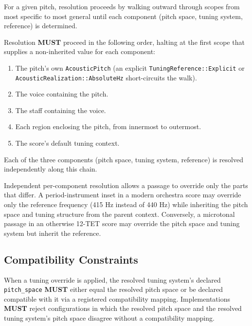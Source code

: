 \documentclass[11pt,letterpaper]{report}
\newcounter{requirement}[chapter]
\newcommand{\MUST}{\textbf{MUST}}
\begin{document}
For a given pitch, resolution proceeds by walking outward through
scopes from most specific to most general until each component
(pitch space, tuning system, reference) is determined.

\begin{requirement}
  \label{req:tuning:tuning-resolution-order}
  Resolution \MUST{} proceed in the following order, halting at the
  first scope that supplies a non-inherited value for each component:

  \begin{enumerate}
    \item The pitch's own \texttt{AcousticPitch} (an explicit
      \texttt{TuningReference::Explicit} or
      \texttt{AcousticRealization::AbsoluteHz} short-circuits the
      walk).
    \item The voice containing the pitch.
    \item The staff containing the voice.
    \item Each region enclosing the pitch, from innermost to outermost.
    \item The score's default tuning context.
  \end{enumerate}

  Each of the three components (pitch space, tuning system, reference)
  is resolved independently along this chain.
\end{requirement}

\begin{rationale}
  Independent per-component resolution allows a passage to override
  only the parts that differ. A period-instrument inset in a modern
  orchestra score may override only the reference frequency (415 Hz
  instead of 440 Hz) while inheriting the pitch space and tuning
  structure from the parent context. Conversely, a microtonal passage
  in an otherwise 12-TET score may override the pitch space and
  tuning system but inherit the reference.
\end{rationale}

\subsection{Compatibility Constraints}

\begin{requirement}
  \label{req:tuning:tuning-system-compatibility}
  When a tuning override is applied, the resolved tuning system's
  declared \texttt{pitch\_space} \MUST{} either equal the resolved
  pitch space or be declared compatible with it via a registered
  compatibility mapping. Implementations \MUST{} reject configurations
  in which the resolved pitch space and the resolved tuning system's
  pitch space disagree without a compatibility mapping.
\end{requirement}
\end{document}
